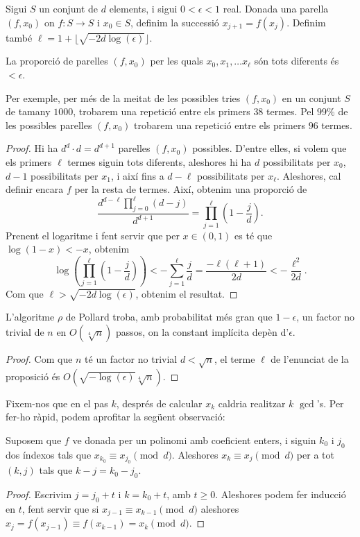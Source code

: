  \begin{proposition}
  Sigui $S$ un conjunt de $d$ elements, i sigui $0<\epsilon<1$ real. Donada una parella $(f,x_0)$ on $f\colon S\to S$ i $x_0\in S$, definim la successió $x_{j+1}=f(x_j)$. Definim també $\ell=1+\lfloor \sqrt{-2d\log(\epsilon)}\rfloor$.
  
  La proporció de parelles $(f,x_0)$ per les quals $x_0,x_1,\ldots x_\ell$ són tots diferents és $< \epsilon$.
 \end{proposition}
 \begin{example}
 Per exemple, per més de la meitat de les possibles tries $(f,x_0)$ en un conjunt $S$ de tamany $1000$, trobarem una repetició entre els primers $38$ termes. Pel $99\%$ de les possibles parelles $(f,x_0)$ trobarem una repetició entre els primers $96$ termes.
 \end{example}
 \begin{proof}
  Hi ha $d^d\cdot d = d^{d+1}$ parelles $(f,x_0)$ possibles. D'entre elles, si volem que els primers $\ell$ termes siguin tots diferents, aleshores hi ha $d$ possibilitats per $x_0$, $d-1$ possibilitats per $x_1$, i així fins a $d-\ell$ possibilitats per $x_\ell$. Aleshores, cal definir encara $f$ per la resta de termes. Així, obtenim una proporció de
 \[
 \frac{d^{d-\ell}\prod_{j=0}^\ell (d-j)}{d^{d+1}} = \prod_{j=1}^\ell \left(1-\frac{j}{d}\right).
 \]
 Prenent el logaritme i fent servir que per $x\in (0,1)$ es té que $\log(1-x)<-x$, obtenim
 \[
 \log \left(\prod_{j=1}^\ell \left(1-\frac jd\right)\right) < -\sum_{j=1}^\ell \frac{j}{d} = \frac{-\ell(\ell+1)}{2d} < -\frac{\ell^2}{2d}.
 \]
 Com que $\ell > \sqrt{-2d\log(\epsilon)}$, obtenim el resultat.
 \end{proof}
 \begin{corollary}
 L'algoritme $\rho$ de Pollard troba, amb probabilitat més gran que $1-\epsilon$, un factor no trivial de $n$ en $O(\sqrt[4]{n})$ passos, on la constant implícita depèn d'$\epsilon$.
 \end{corollary}
 \begin{proof}
  Com que $n$ té un factor no trivial $d<\sqrt{n}$, el terme $\ell$ de l'enunciat de la proposició és $O\left(\sqrt{-\log(\epsilon)}\sqrt[4]{n}\right)$.
 \end{proof}
 
 Fixem-nos que en el pas $k$, després de calcular $x_k$ caldria realitzar $k$ $\gcd$'s. Per fer-ho ràpid, podem aprofitar la següent observació:
 
 \begin{lemma}
 Suposem que $f$ ve donada per un polinomi amb coeficient enters, i siguin $k_0$ i $j_0$ dos índexos tals que $x_{k_0}\equiv x_{j_0}\pmod{d}$. Aleshores $x_k\equiv x_j\pmod{d}$ per a tot $(k,j)$ tals que $k-j=k_0-j_0$.
 \end{lemma}
 \begin{proof}
  Escrivim $j=j_0+t$ i $k=k_0+t$, amb $t\geq 0$. Aleshores podem fer inducció en $t$, fent servir que si $x_{j-1}\equiv x_{k-1}\pmod{d}$ aleshores $x_j=f(x_{j-1})\equiv f(x_{k-1})=x_k\pmod d$.
 \end{proof}
 

